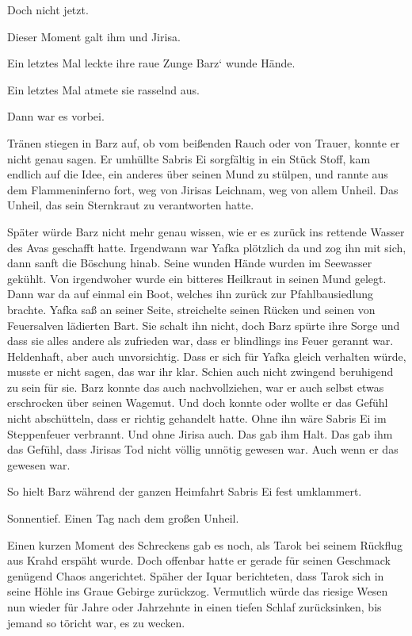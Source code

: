Doch nicht jetzt.

Dieser Moment galt ihm und Jirisa.

Ein letztes Mal leckte ihre raue Zunge Barz‘ wunde Hände.

Ein letztes Mal atmete sie rasselnd aus.

Dann war es vorbei.

Tränen stiegen in Barz auf, ob vom beißenden Rauch oder von Trauer, konnte er nicht genau sagen. Er umhüllte Sabris Ei sorgfältig in ein Stück Stoff, kam endlich auf die Idee, ein anderes über seinen Mund zu stülpen, und rannte aus dem Flammeninferno fort, weg von Jirisas Leichnam, weg von allem Unheil. Das Unheil, das sein Sternkraut zu verantworten hatte.

Später würde Barz nicht mehr genau wissen, wie er es zurück ins rettende Wasser des Avas geschafft hatte. Irgendwann war Yafka plötzlich da und zog ihn mit sich, dann sanft die Böschung hinab. Seine wunden Hände wurden im Seewasser gekühlt. Von irgendwoher wurde ein bitteres Heilkraut in seinen Mund gelegt. Dann war da auf einmal ein Boot, welches ihn zurück zur Pfahlbausiedlung brachte. Yafka saß an seiner Seite, streichelte seinen Rücken und seinen von Feuersalven lädierten Bart. Sie schalt ihn nicht, doch Barz spürte ihre Sorge und dass sie alles andere als zufrieden war, dass er blindlings ins Feuer gerannt war. Heldenhaft, aber auch unvorsichtig. Dass er sich für Yafka gleich verhalten würde, musste er nicht sagen, das war ihr klar. Schien auch nicht zwingend beruhigend zu sein für sie. Barz konnte das auch nachvollziehen, war er auch selbst etwas erschrocken über seinen Wagemut. Und doch konnte oder wollte er das Gefühl nicht abschütteln, dass er richtig gehandelt hatte. Ohne ihn wäre Sabris Ei im Steppenfeuer verbrannt. Und ohne Jirisa auch. Das gab ihm Halt. Das gab ihm das Gefühl, dass Jirisas Tod nicht völlig unnötig gewesen war. Auch wenn er das gewesen war.

So hielt Barz während der ganzen Heimfahrt Sabris Ei fest umklammert.



\trennzeichen



Sonnentief. Einen Tag nach dem großen Unheil.\bigskip



Einen kurzen Moment des Schreckens gab es noch, als Tarok bei seinem Rückflug aus Krahd erspäht wurde. Doch offenbar hatte er gerade für seinen Geschmack genügend Chaos angerichtet. Späher der Iquar berichteten, dass Tarok sich in seine Höhle ins Graue Gebirge zurückzog. Vermutlich würde das riesige Wesen nun wieder für Jahre oder Jahrzehnte in einen tiefen Schlaf zurücksinken, bis jemand so töricht war, es zu wecken.

